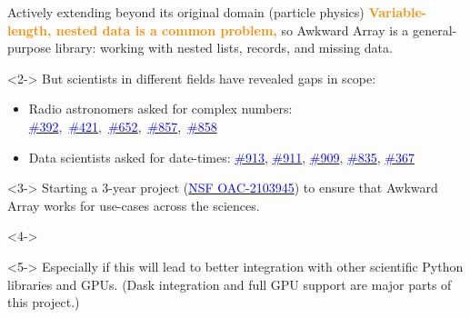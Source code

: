 \documentclass[aspectratio=169]{beamer}
\begin{document}
\begin{frame}{Actively extending beyond its original domain (particle physics)}
\large
\vspace{0.35 cm}
\textcolor{darkorange}{\bf Variable-length, nested data is a common problem,} so Awkward Array is a general-purpose library: working with nested lists, records, and missing data.

\begin{uncoverenv}<2->
\vspace{0.35 cm}
But scientists in different fields have revealed gaps in scope:

\begin{itemize}
\item Radio astronomers asked for complex numbers: \mbox{\normalsize \href{https://github.com/scikit-hep/awkward-1.0/issues/392}{\textcolor{blue}{\#392}}, \href{https://github.com/scikit-hep/awkward-1.0/pull/421}{\textcolor{blue}{\#421}}, \href{https://github.com/scikit-hep/awkward-1.0/pull/652}{\textcolor{blue}{\#652}}, \href{https://github.com/scikit-hep/awkward-1.0/issues/857}{\textcolor{blue}{\#857}}, \href{https://github.com/scikit-hep/awkward-1.0/pull/858}{\textcolor{blue}{\#858}}\hspace{-0.5 cm}}
\item Data scientists asked for date-times: {\normalsize \href{https://github.com/scikit-hep/awkward-1.0/issues/913}{\textcolor{blue}{\#913}}, \href{https://github.com/scikit-hep/awkward-1.0/pull/911}{\textcolor{blue}{\#911}}, \href{https://github.com/scikit-hep/awkward-1.0/issues/909}{\textcolor{blue}{\#909}}, \href{https://github.com/scikit-hep/awkward-1.0/pull/835}{\textcolor{blue}{\#835}}, \href{https://github.com/scikit-hep/awkward-1.0/issues/367}{\textcolor{blue}{\#367}}}
\end{itemize}
\end{uncoverenv}

\begin{uncoverenv}<3->
\vspace{0.35 cm}
Starting a 3-year project {\normalsize (\href{https://www.nsf.gov/awardsearch/showAward?AWD_ID=2103945&HistoricalAwards=false}{\textcolor{blue}{NSF OAC-2103945}})} to ensure that Awkward Array works for use-cases across the sciences.
\end{uncoverenv}

\begin{uncoverenv}<4->
\vspace{0.35 cm}
\setlength{\fboxsep}{0.3 cm}
\end{uncoverenv}

\begin{uncoverenv}<5->
\normalsize
\vspace{0.35 cm}
Especially if this will lead to better integration with other scientific Python libraries and GPUs. (Dask integration and full GPU support are major parts of this project.)
\end{uncoverenv}
\end{frame}
\end{document}
